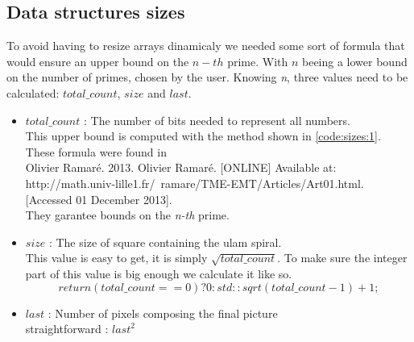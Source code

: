 \subsection{Data structures sizes}
To avoid having to resize arrays dinamicaly we needed some sort of formula that would ensure an upper bound on the $n-th$ prime. With $n$ beeing a lower bound on the number of primes, chosen by the user. Knowing \textit{n}, three values need to be calculated: $total\_count$, $size$ and $last$.
\begin{itemize}
	\item{$total\_count$} 
	: The number of bits needed to represent all numbers.\\ This upper bound is computed with the method shown in \ref{code:sizes:1}.\\ These formula were found in \\Olivier Ramaré. 2013. Olivier Ramaré. [ONLINE] Available at: http://math.univ-lille1.fr/~ramare/TME-EMT/Articles/Art01.html. [Accessed 01 December 2013]. \\They garantee bounds on the \textit{n-th} prime.
	\item{$size$} 
	: The size of square containing the ulam spiral.\\
	This value is easy to get, it is simply $\sqrt{total\_count}$. To make sure the integer part of this value is big enough we calculate it like so.
	$$return (total\_count == 0) ? 0 : std::sqrt(total\_count - 1) + 1;$$

	\item{$last$}
	: Number of pixels composing the final picture\\
	straightforward : ${last}^{2}$
	
	
\end{itemize}


